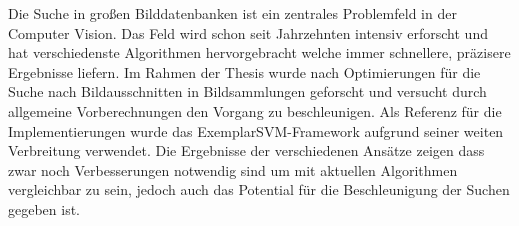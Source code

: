 Die Suche in großen Bilddatenbanken ist ein zentrales Problemfeld in der Computer Vision. Das Feld wird schon seit Jahrzehnten intensiv erforscht und hat verschiedenste Algorithmen hervorgebracht welche immer schnellere, präzisere Ergebnisse liefern. Im Rahmen der Thesis wurde nach Optimierungen für die Suche nach Bildausschnitten in Bildsammlungen geforscht und versucht durch allgemeine Vorberechnungen den Vorgang zu beschleunigen. Als Referenz für die Implementierungen wurde das ExemplarSVM-Framework \cite{Malisiewicz2011} aufgrund seiner weiten Verbreitung verwendet. Die Ergebnisse der verschiedenen Ansätze zeigen dass zwar noch Verbesserungen notwendig sind um mit aktuellen Algorithmen vergleichbar zu sein, jedoch auch das Potential für die Beschleunigung der Suchen gegeben ist.